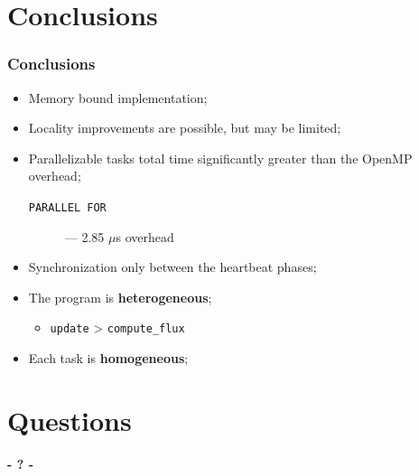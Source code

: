\documentclass{beamer}
\begin{document}
\section{Conclusions}
\begin{frame}
	\frametitle{Conclusions}
	\begin{itemize}
		\item{Memory bound implementation;}
		\item{Locality improvements are possible, but may be limited;}
		\item{Parallelizable tasks total time significantly greater than the OpenMP overhead;
			\begin{description}
				\item[\texttt{PARALLEL FOR}]{--- 2.85 $\mu$s overhead}
			\end{description}
		}
		\item{Synchronization only between the heartbeat phases;}
		\item{The program is \textbf{heterogeneous};
		\begin{itemize}
			\item{\texttt{update} > \texttt{compute\_flux}}
		\end{itemize}
		}
		\item{Each task is \textbf{homogeneous};}
	\end{itemize}
\end{frame}

\section{Questions}
\begin{frame}
	\titlepage
	\begin{center}
		\Huge\bfseries
		- ? -
	\end{center}
\end{frame}
\end{document}
